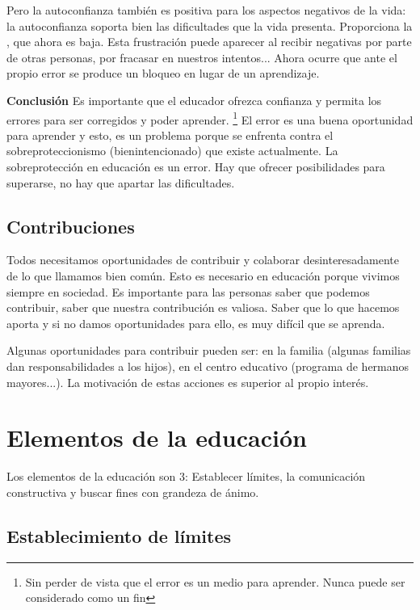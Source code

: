 \documentclass[palatino]{apuntesURJC}
\begin{document}
	Pero la autoconfianza también es positiva para los aspectos negativos de la vida: la autoconfianza soporta bien las dificultades que la vida presenta.
	Proporciona la , que ahora es baja.
	Esta frustración puede aparecer al recibir negativas por parte de otras personas, por fracasar en nuestros intentos... Ahora ocurre que ante el propio error se produce un bloqueo en lugar de un aprendizaje.

	\textbf{Conclusión} Es importante que el educador ofrezca confianza y permita los errores para ser corregidos y poder aprender. 
	\footnote{Sin perder de vista que el error es un medio para aprender. Nunca puede ser considerado como un fin}
	El error es una buena oportunidad para aprender y esto, es un problema porque se enfrenta contra el sobreproteccionismo (bienintencionado) que existe actualmente.
	La sobreprotección en educación es un error.
	Hay que ofrecer posibilidades para superarse, no hay que apartar las dificultades.

	\subsection{Contribuciones}
	Todos necesitamos oportunidades de contribuir y colaborar desinteresadamente de lo que llamamos bien común. 
	Esto es necesario en educación porque vivimos siempre en sociedad. 
	Es importante para las personas saber que podemos contribuir, saber que nuestra contribución es valiosa. Saber que lo que hacemos aporta y si no damos oportunidades para ello, es muy difícil que se aprenda.

	Algunas oportunidades para contribuir pueden ser: en la familia (algunas familias dan responsabilidades a los hijos), en el centro educativo (programa de hermanos mayores...).
	La motivación de estas acciones es superior al propio interés.


\section{Elementos de la educación}

Los elementos de la educación son 3: Establecer límites, la comunicación constructiva y buscar fines con grandeza de ánimo.

\subsection{Establecimiento de límites}
\end{document}

